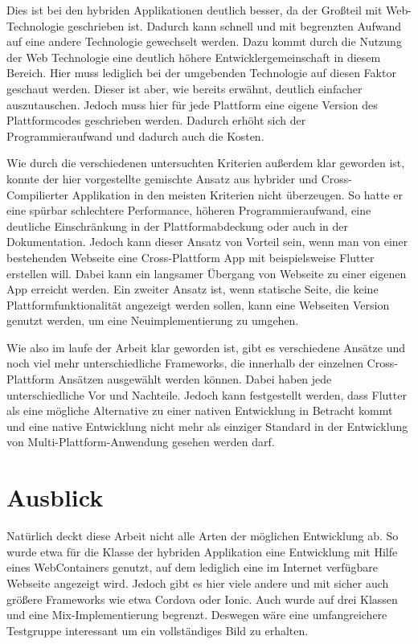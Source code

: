 Dies ist bei den hybriden Applikationen deutlich besser, da der Großteil mit Web-Technologie geschrieben ist. Dadurch kann schnell und mit begrenzten Aufwand auf eine andere Technologie gewechselt werden. Dazu kommt durch die Nutzung der Web Technologie eine deutlich höhere Entwicklergemeinschaft in diesem Bereich. Hier muss lediglich bei der umgebenden Technologie auf diesen Faktor geschaut werden. Dieser ist aber, wie bereits erwähnt, deutlich einfacher auszutauschen. Jedoch muss hier für jede Plattform eine eigene Version des Plattformcodes geschrieben werden. Dadurch erhöht sich der Programmieraufwand und dadurch auch die Kosten.

Wie durch die verschiedenen untersuchten Kriterien außerdem klar geworden ist, konnte der hier vorgestellte gemischte Ansatz aus hybrider und Cross-Compilierter Applikation in den meisten Kriterien nicht überzeugen. So hatte er eine spürbar schlechtere Performance, höheren Programmieraufwand, eine deutliche Einschränkung in der Plattformabdeckung oder auch in der Dokumentation. Jedoch kann dieser Ansatz von Vorteil sein, wenn man von einer bestehenden Webseite eine Cross-Plattform App mit beispielsweise Flutter erstellen will. Dabei kann ein langsamer Übergang von Webseite zu einer eigenen App erreicht werden. Ein zweiter Ansatz ist, wenn statische Seite, die keine Plattformfunktionalität angezeigt werden sollen, kann eine Webseiten Version genutzt werden, um eine Neuimplementierung zu umgehen.

Wie also im laufe der Arbeit klar geworden ist, gibt es verschiedene Ansätze und noch viel mehr unterschiedliche Frameworks, die innerhalb der einzelnen Cross-Plattform Ansätzen ausgewählt werden können. Dabei haben jede unterschiedliche Vor und Nachteile. Jedoch kann festgestellt werden, dass Flutter als eine mögliche Alternative zu einer nativen Entwicklung in Betracht kommt und eine native Entwicklung nicht mehr als einziger Standard in der Entwicklung von Multi-Plattform-Anwendung gesehen werden darf.

\section{Ausblick}
Natürlich deckt diese Arbeit nicht alle Arten der möglichen Entwicklung ab. So wurde etwa für die Klasse der hybriden Applikation eine Entwicklung mit Hilfe eines WebContainers genutzt, auf dem lediglich eine im Internet verfügbare Webseite angezeigt wird. Jedoch gibt es hier viele andere und mit sicher auch größere Frameworks wie etwa Cordova oder Ionic. Auch wurde auf drei Klassen und eine Mix-Implementierung begrenzt. Deswegen wäre eine umfangreichere Testgruppe interessant um ein vollständiges Bild zu erhalten.

